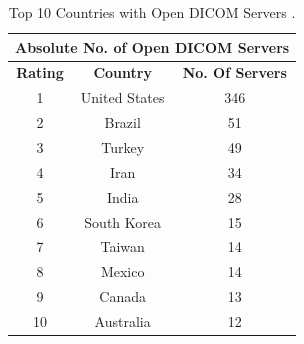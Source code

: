 \documentclass[pdf,bookmarks,colorlinks=true]{IEEEtran}
\begin{document}
\begin{table}[tbh!]
\caption{Top 10 Countries with Open DICOM Servers \cite{stites2016secure}.}
\label{tab:DICOMServers}
\centering
\begin{tabular}{|c|c|c|}
	\hline 
	\multicolumn{3}{|c|}{\textbf{Absolute No. of Open DICOM Servers}} \\ 
	\hline
	\textbf{Rating} & \textbf{Country} & \textbf{No. Of Servers} \\ 
	\hline 
	1 & United States & 346 \\ 
	\hline 
	2 & Brazil & 51 \\ 
	\hline 
	3 & Turkey & 49 \\ 
	\hline 
	4 & Iran & 34 \\ 
	\hline 
	5 & India & 28 \\ 
	\hline 
	6 & South Korea & 15 \\ 
	\hline 
	7 & Taiwan & 14 \\ 
	\hline 
	8 & Mexico & 14 \\ 
	\hline 
	9 & Canada & 13 \\ 
	\hline 
	10 & Australia & 12 \\ 
	\hline 
\end{tabular}
\end{table} 
\end{document}
